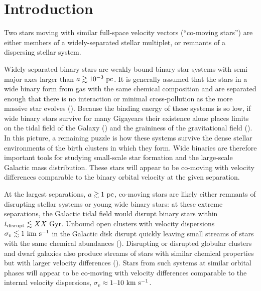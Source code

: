 \documentclass[manuscript, letterpaper]{aastex6}
\newcommand{\kms}{\rm km~s^{-1}}
\begin{document}

\section{Introduction} \label{sec:intro}

Two stars moving with similar full-space velocity vectors (``co-moving stars'')
are either members of a widely-separated stellar multiplet, or remnants of a
dispersing stellar system.

Widely-separated binary stars are weakly bound binary star systems with
semi-major axes larger than $a \gtrsim 10^{-3}~{\rm pc}$. It is generally
assumed that the stars in a wide binary form from gas with the same chemical
composition and are separated enough that there is no interaction or minimal
cross-pollution as the more massive star evolves (\citealt{todo}). Because the
binding energy of these systems is so low, if wide binary stars survive for many
Gigayears their existence alone places limits on the tidal field of the Galaxy
(\citealt{todo}) and the graininess of the gravitational field (\citealt{todo}).
In this picture, a remaining puzzle is how these systems survive the dense
stellar environments of the birth clusters in which they form. Wide binaries are
therefore important tools for studying small-scale star formation and the
large-scale Galactic mass distribution. These stars will appear to be co-moving
with velocity differences comparable to the binary orbital velocity at the
given separation.

At the largest separations, $a \gtrsim 1~{\rm pc}$, co-moving stars are likely
either remnants of disrupting stellar systems or young wide binary stars: at
these extreme separations, the Galactic tidal field would disrupt binary stars
within $t_{\rm disrupt} \lesssim XX~{\rm Gyr}$. Unbound open clusters with
velocity dispersions $\sigma_v \lesssim 1~\kms$ in the Galactic disk disrupt
quickly leaving small streams of stars with the same chemical abundances
(\citealt{chemicaltaggingstuff}). Disrupting or disrupted globular clusters and
dwarf galaxies also produce streams of stars with similar chemical properties
but with larger velocity differences (\citealt{streampeeps}). Stars from such
systems at similar orbital phases will appear to be co-moving with velocity
differences comparable to the internal velocity dispersions, $\sigma_v \approx
1$--$10~\kms$.
\end{document}
